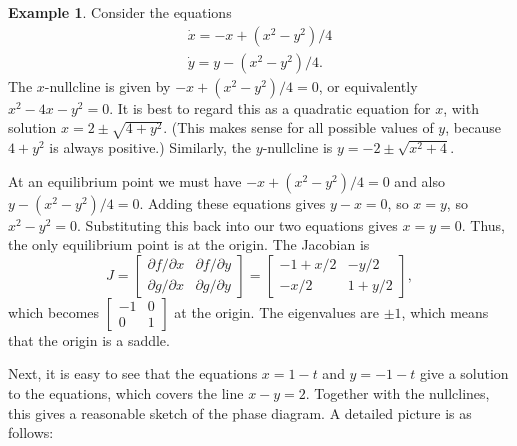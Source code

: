 \documentclass[reqno]{amsart}
\theoremstyle{definition}
\newtheorem{example}[theorem]{Example}
\begin{document}
\begin{example}\label{eg-limit-line}
 Consider the equations
 \begin{align*}
  \dot{x} = -x+(x^2-y^2)/4 \\
  \dot{y} = y-(x^2-y^2)/4.
 \end{align*}
 The $x$-nullcline is given by $-x+(x^2-y^2)/4=0$, or equivalently
 $x^2-4x-y^2=0$.  It is best to regard this as a quadratic equation
 for $x$, with solution $x=2\pm\sqrt{4+y^2}$.  (This makes sense for
 all possible values of $y$, because $4+y^2$ is always positive.)
 Similarly, the $y$-nullcline is $y=-2\pm\sqrt{x^2+4}$.

 At an equilibrium point we must have $-x+(x^2-y^2)/4=0$ and also
 $y-(x^2-y^2)/4=0$.  Adding these equations gives $y-x=0$, so $x=y$,
 so $x^2-y^2=0$.  Substituting this back into our two equations gives
 $x=y=0$.  Thus, the only equilibrium point is at the origin.  The
 Jacobian is 
 \[ J = \left[\begin{array}{cc} \partial f/\partial x & \partial f/\partial y \\
             \partial g/\partial x & \partial g/\partial y \end{array}\right]
      = \left[\begin{array}{cc} -1+x/2 & -y/2 \\ -x/2 & 1+y/2 \end{array}\right],
 \]
 which becomes $\left[\begin{array}{cc} -1 & 0 \\ 0 & 1 \end{array}\right]$ at the origin.  The
 eigenvalues are $\pm 1$, which means that the origin is a saddle.  

 Next, it is easy to see that the equations $x=1-t$ and $y=-1-t$ give
 a solution to the equations, which covers the line $x-y=2$.  Together
 with the nullclines, this gives a reasonable sketch of the phase
 diagram.  A detailed picture is as follows:


\end{example}
\end{document}
